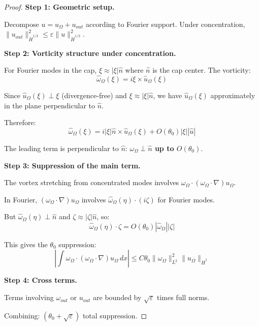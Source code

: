 \documentclass[11pt]{article}
\theoremstyle{definition}
\begin{document}
\begin{proof}
\textbf{Step 1: Geometric setup.}

Decompose $u = u_\Omega + u_{out}$ according to Fourier support. Under concentration, $\|u_{out}\|_{\dot{H}^{1/2}}^2 \leq \varepsilon\|u\|_{\dot{H}^{1/2}}^2$.

\textbf{Step 2: Vorticity structure under concentration.}

For Fourier modes in the cap, $\xi \approx |\xi|\hat{n}$ where $\hat{n}$ is the cap center. The vorticity:
\[
\hat{\omega}_\Omega(\xi) = i\xi \times \hat{u}_\Omega(\xi)
\]

Since $\hat{u}_\Omega(\xi) \perp \xi$ (divergence-free) and $\xi \approx |\xi|\hat{n}$, we have $\hat{u}_\Omega(\xi)$ approximately in the plane perpendicular to $\hat{n}$.

Therefore:
\[
\hat{\omega}_\Omega(\xi) = i|\xi|\hat{n} \times \hat{u}_\Omega(\xi) + O(\theta_0)|\xi||\hat{u}|
\]

The leading term is perpendicular to $\hat{n}$: \textbf{$\omega_\Omega \perp \hat{n}$ up to $O(\theta_0)$}.

\textbf{Step 3: Suppression of the main term.}

The vortex stretching from concentrated modes involves $\omega_\Omega \cdot (\omega_\Omega \cdot \nabla)u_\Omega$.

In Fourier, $(\omega_\Omega \cdot \nabla)u_\Omega$ involves $\hat{\omega}_\Omega(\eta) \cdot (i\zeta)$ for Fourier modes.

But $\hat{\omega}_\Omega(\eta) \perp \hat{n}$ and $\zeta \approx |\zeta|\hat{n}$, so:
\[
\hat{\omega}_\Omega(\eta) \cdot \zeta = O(\theta_0)|\hat{\omega}_\Omega||\zeta|
\]

This gives the $\theta_0$ suppression:
\[
\left|\int \omega_\Omega \cdot (\omega_\Omega \cdot \nabla)u_\Omega \, dx\right| \leq C\theta_0\|\omega_\Omega\|_{L^2}^2 \|u_\Omega\|_{\dot{H}^1}
\]

\textbf{Step 4: Cross terms.}

Terms involving $\omega_{out}$ or $u_{out}$ are bounded by $\sqrt{\varepsilon}$ times full norms.

Combining: $(\theta_0 + \sqrt{\varepsilon})$ total suppression.
\end{proof}
\end{document}

